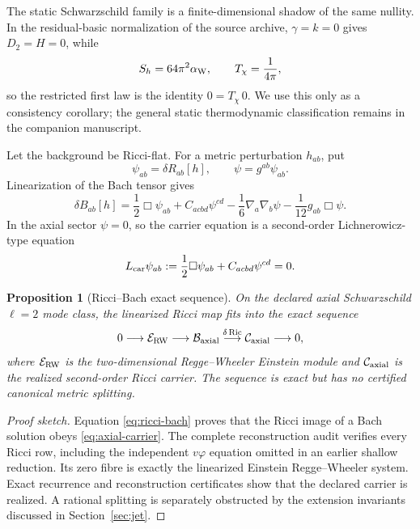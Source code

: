 \documentclass[11pt]{article}
\newtheorem{proposition}[theorem]{Proposition}
\theoremstyle{definition}
\theoremstyle{remark}
\newcommand{\Ric}{\operatorname{Ric}}
\begin{document}
The static Schwarzschild family is a finite-dimensional shadow of the same
nullity.  In the residual-basic normalization of the source archive,
\(\gamma=k=0\) gives \(D_2=H=0\), while
\[
S_h=64\pi^2\alpha_{\rm W},
\qquad
T_\chi=\frac1{4\pi},
\]
so the restricted first law is the identity \(0=T_\chi\,0\).  We use this
only as a consistency corollary; the general static thermodynamic
classification remains in the companion manuscript.

Let the background be Ricci-flat.  For a metric perturbation \(h_{ab}\), put
\[
\psi_{ab}=\delta R_{ab}[h],
\qquad
\psi=g^{ab}\psi_{ab}.
\]
Linearization of the Bach tensor gives
\begin{equation}
\label{eq:ricci-bach}
\delta B_{ab}[h]
=
\frac12\Box\psi_{ab}
+C_{acbd}\psi^{cd}
-\frac16\nabla_a\nabla_b\psi
-\frac1{12}g_{ab}\Box\psi.
\end{equation}
In the axial sector \(\psi=0\), so the carrier equation is a second-order
Lichnerowicz-type equation
\begin{equation}
\label{eq:axial-carrier}
L_{\rm car}\psi_{ab}
:=
\frac12\Box\psi_{ab}+C_{acbd}\psi^{cd}=0.
\end{equation}

\begin{proposition}[Ricci--Bach exact sequence]
\label{prop:exact-sequence}
On the declared axial Schwarzschild \(\ell=2\) mode class, the linearized
Ricci map fits into the exact sequence
\begin{equation}
\label{eq:exact-sequence}
0\longrightarrow
\mathcal E_{\rm RW}
\longrightarrow
\mathcal B_{\rm axial}
\overset{\delta\Ric}{\longrightarrow}
\mathcal C_{\rm axial}
\longrightarrow0,
\end{equation}
where \(\mathcal E_{\rm RW}\) is the two-dimensional Regge--Wheeler
Einstein module and \(\mathcal C_{\rm axial}\) is the realized
second-order Ricci carrier.  The sequence is exact but has no certified
canonical metric splitting.
\end{proposition}

\begin{proof}[Proof sketch]
Equation \eqref{eq:ricci-bach} proves that the Ricci image of a Bach solution
obeys \eqref{eq:axial-carrier}.  The complete reconstruction audit verifies
every Ricci row, including the independent \(v\varphi\) equation omitted in an
earlier shallow reduction.  Its zero fibre is exactly the linearized Einstein
Regge--Wheeler system.  Exact recurrence and reconstruction certificates show
that the declared carrier is realized.  A rational splitting is separately
obstructed by the extension invariants discussed in Section~\ref{sec:jet}.
\end{proof}
\end{document}
